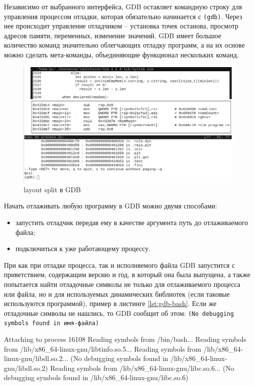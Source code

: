 Независимо от выбранного интерфейса, GDB оставляет командную строку для 
управления процессом отладки, которая обязательно начинается с \verb|(gdb)|.
Через нее происходит управление отладчиком -- установка точек останова,
просмотр адресов памяти, переменных, изменение значений.
GDB имеет большое количество команд значительно облегчающих отладку программ, 
а на их основе можно сделать мета-команды, объединяющие функционал нескольких
команд.

\begin{figure}[!hbtp]
    \includegraphics[width=\textwidth,height=\textheight,keepaspectratio]{images/split-layout.png}
    \caption{layout split в GDB\label{fig:layout-split}}
\end{figure}

Начать отлаживать любую программу в GDB можно двумя способами:
\begin{itemize}
    \item запустить отладчик передав ему в качестве аргумента путь до отлаживаемого файла;
    \item подключиться к уже работающему процессу.
\end{itemize}

При как при отладке процесса, так и исполняемого файла GDB
запустится с приветствием, содержащим версию и год, в который она была выпущена,
а также попытается найти отладочные символы не только для отлаживаемого процесса или файла, 
но и для используемых динамических библиотек (если таковые используются программой),
пример в листинге \autoref{lst:gdb-bash}.
Если же отладочные символы не нашлись, то GDB сообщит об этом:
\verb|(No debugging symbols found in имя-файла)|

\begin{ListingEnv}[!h]
    \captiondelim{ }
    \caption{Отладка Bash}\label{lst:gdb-bash}
    \small
    \begin{Verb}[]
        Attaching to process 16108
        Reading symbols from /bin/bash...
        Reading symbols from /lib/x86_64-linux-gnu/libtinfo.so.5...
        Reading symbols from /lib/x86_64-linux-gnu/libdl.so.2...
        (No debugging symbols found in /lib/x86_64-linux-gnu/libdl.so.2)
        Reading symbols from /lib/x86_64-linux-gnu/libc.so.6...
        (No debugging symbols found in /lib/x86_64-linux-gnu/libc.so.6)
    \end{Verb}
\end{ListingEnv}
\newpage

